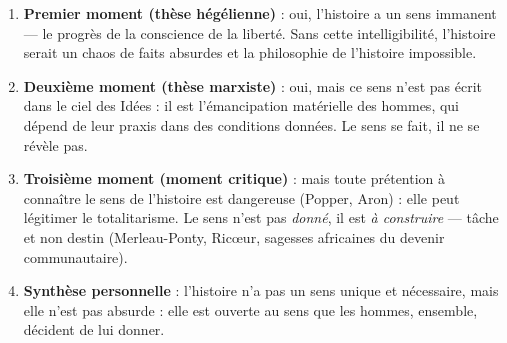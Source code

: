 \documentclass[11pt]{article}
\begin{document}
\begin{methode}
\begin{enumerate}
\item \textbf{Premier moment (thèse hégélienne)} : oui, l'histoire a un sens immanent — le progrès de la conscience de la liberté. Sans cette intelligibilité, l'histoire serait un chaos de faits absurdes et la philosophie de l'histoire impossible.
\item \textbf{Deuxième moment (thèse marxiste)} : oui, mais ce sens n'est pas écrit dans le ciel des Idées : il est l'émancipation matérielle des hommes, qui dépend de leur praxis dans des conditions données. Le sens se fait, il ne se révèle pas.
\item \textbf{Troisième moment (moment critique)} : mais toute prétention à connaître le sens de l'histoire est dangereuse (Popper, Aron) : elle peut légitimer le totalitarisme. Le sens n'est pas \emph{donné}, il est \emph{à construire} — tâche et non destin (Merleau-Ponty, Ricœur, sagesses africaines du devenir communautaire).
\item \textbf{Synthèse personnelle} : l'histoire n'a pas un sens unique et nécessaire, mais elle n'est pas absurde : elle est ouverte au sens que les hommes, ensemble, décident de lui donner.
\end{enumerate}
\end{methode}
\end{document}
